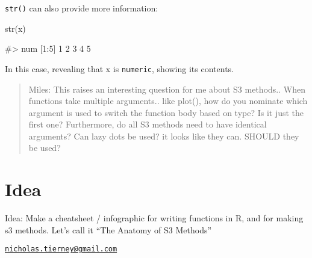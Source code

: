 \texttt{str()} can also provide more information:

\begin{Schunk}
\begin{Sinput}
str(x)
\end{Sinput}
\begin{Soutput}
#>  num [1:5] 1 2 3 4 5
\end{Soutput}
\end{Schunk}

In this case, revealing that x is \texttt{numeric}, showing its
contents.

\begin{quote}
Miles: This raises an interesting question for me about S3 methods..
When functions take multiple arguments.. like plot(), how do you
nominate which argument is used to switch the function body based on
type? Is it just the first one? Furthermore, do all S3 methods need to
have identical arguments? Can lazy dots be used? it looks like they can.
SHOULD they be used?
\end{quote}

\section{Idea}\label{idea}

Idea: Make a cheatsheet / infographic for writing functions in R, and
for making s3 methods. Let's call it ``The Anatomy of S3 Methods''

\address{%
Nicholas Tierney\\
Queensland University of Technology\\
Level 8, Y Block, Main Drive, QUT, Brisbane, Australia\\
}
\href{mailto:nicholas.tierney@gmail.com}{\nolinkurl{nicholas.tierney@gmail.com}}

